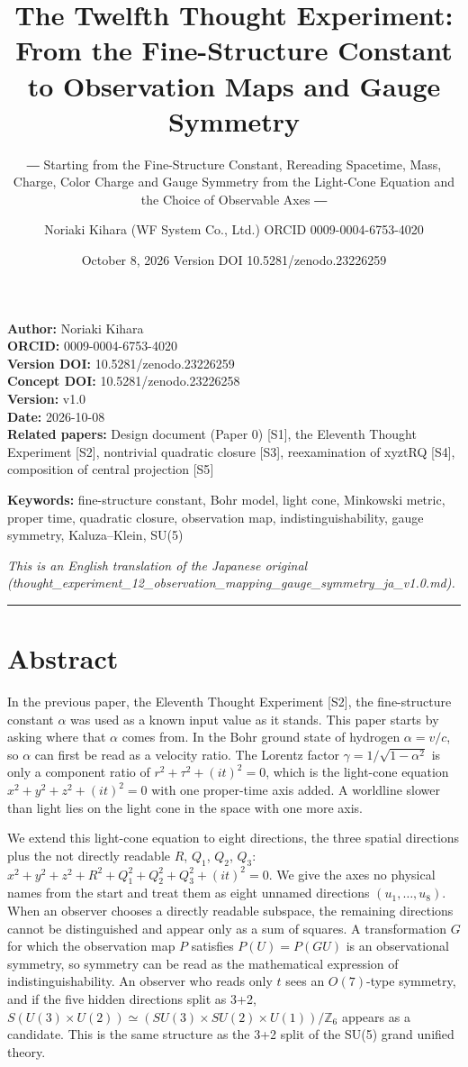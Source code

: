 \documentclass[
  a4paper,
]{article}
\title{The Twelfth Thought Experiment: From the Fine-Structure Constant
to Observation Maps and Gauge Symmetry}
\subtitle{― Starting from the Fine-Structure Constant, Rereading
Spacetime, Mass, Charge, Color Charge and Gauge Symmetry from the
Light-Cone Equation and the Choice of Observable Axes ―}
\author{Noriaki Kihara (WF System Co., Ltd.) ORCID 0009-0004-6753-4020}
\date{October 8, 2026 Version DOI 10.5281/zenodo.23226259}
\begin{document}
\maketitle

\textbf{Author:} Noriaki Kihara\\
\textbf{ORCID:} 0009-0004-6753-4020\\
\textbf{Version DOI:} 10.5281/zenodo.23226259\\
\textbf{Concept DOI:} 10.5281/zenodo.23226258\\
\textbf{Version:} v1.0\\
\textbf{Date:} 2026-10-08\\
\textbf{Related papers:} Design document (Paper 0) {[}S1{]}, the
Eleventh Thought Experiment {[}S2{]}, nontrivial quadratic closure
{[}S3{]}, reexamination of xyztRQ {[}S4{]}, composition of central
projection {[}S5{]}

\textbf{Keywords:} fine-structure constant, Bohr model, light cone,
Minkowski metric, proper time, quadratic closure, observation map,
indistinguishability, gauge symmetry, Kaluza--Klein, SU(5)

\emph{This is an English translation of the Japanese original
(thought\_experiment\_12\_observation\_mapping\_gauge\_symmetry\_ja\_v1.0.md).}

\begin{center}\rule{0.5\linewidth}{0.5pt}\end{center}

\section{Abstract}\label{abstract}

In the previous paper, the Eleventh Thought Experiment {[}S2{]}, the
fine-structure constant \(\alpha\) was used as a known input value as it
stands. This paper starts by asking where that \(\alpha\) comes from. In
the Bohr ground state of hydrogen \(\alpha=v/c\), so \(\alpha\) can
first be read as a velocity ratio. The Lorentz factor
\(\gamma=1/\sqrt{1-\alpha^2}\) is only a component ratio of
\(r^2+\tau^2+(it)^2=0\), which is the light-cone equation
\(x^2+y^2+z^2+(it)^2=0\) with one proper-time axis added. A worldline
slower than light lies on the light cone in the space with one more
axis.

We extend this light-cone equation to eight directions, the three
spatial directions plus the not directly readable \(R\), \(Q_1\),
\(Q_2\), \(Q_3\): \(x^2+y^2+z^2+R^2+Q_1^2+Q_2^2+Q_3^2+(it)^2=0\). We
give the axes no physical names from the start and treat them as eight
unnamed directions \((u_1,\ldots,u_8)\). When an observer chooses a
directly readable subspace, the remaining directions cannot be
distinguished and appear only as a sum of squares. A transformation
\(G\) for which the observation map \(P\) satisfies \(P(U)=P(GU)\) is an
observational symmetry, so symmetry can be read as the mathematical
expression of indistinguishability. An observer who reads only \(t\)
sees an \(O(7)\)-type symmetry, and if the five hidden directions split
as 3+2,
\(S(U(3)\times U(2))\simeq(SU(3)\times SU(2)\times U(1))/\mathbb Z_6\)
appears as a candidate. This is the same structure as the 3+2 split of
the SU(5) grand unified theory.
\end{document}
